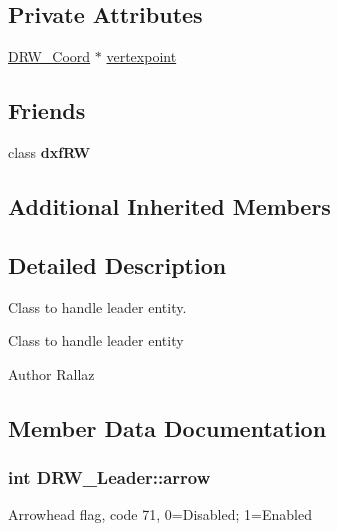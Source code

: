 \subsection*{Private Attributes}
\begin{DoxyCompactItemize}
\item 
\hyperlink{class_d_r_w___coord}{D\+R\+W\+\_\+\+Coord} $\ast$ \hyperlink{class_d_r_w___leader_a06568734914212d4d5fca83114459a2a}{vertexpoint}
\end{DoxyCompactItemize}
\subsection*{Friends}
\begin{DoxyCompactItemize}
\item 
\hypertarget{class_d_r_w___leader_a7f080e77e5112f8364c61b97387f8ee2}{}class {\bfseries dxf\+R\+W}\label{class_d_r_w___leader_a7f080e77e5112f8364c61b97387f8ee2}

\end{DoxyCompactItemize}
\subsection*{Additional Inherited Members}


\subsection{Detailed Description}
Class to handle leader entity. 

Class to handle leader entity \begin{DoxyAuthor}{Author}
Rallaz 
\end{DoxyAuthor}


\subsection{Member Data Documentation}
\hypertarget{class_d_r_w___leader_a42f61a808411cf8465ec7f64c49cc4a6}{}
\subsubsection[{arrow}]{\setlength{\rightskip}{0pt plus 5cm}int D\+R\+W\+\_\+\+Leader\+::arrow}\label{class_d_r_w___leader_a42f61a808411cf8465ec7f64c49cc4a6}
Arrowhead flag, code 71, 0=Disabled; 1=Enabled \hypertarget{class_d_r_w___leader_afdff2ddfa67b8f2f46b367f52e06e027}{}
